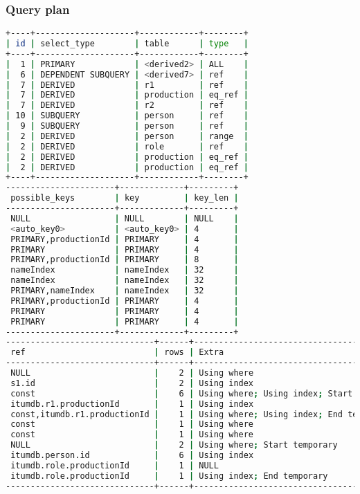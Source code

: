 \subsubsection{Query plan}
\begin{lstlisting}[language=bash]
+----+--------------------+------------+--------+
| id | select_type        | table      | type   |
+----+--------------------+------------+--------+
|  1 | PRIMARY            | <derived2> | ALL    |
|  6 | DEPENDENT SUBQUERY | <derived7> | ref    |
|  7 | DERIVED            | r1         | ref    |
|  7 | DERIVED            | production | eq_ref |
|  7 | DERIVED            | r2         | ref    |
| 10 | SUBQUERY           | person     | ref    |
|  9 | SUBQUERY           | person     | ref    |
|  2 | DERIVED            | person     | range  |
|  2 | DERIVED            | role       | ref    |
|  2 | DERIVED            | production | eq_ref |
|  2 | DERIVED            | production | eq_ref |
+----+--------------------+------------+--------+
----------------------+-------------+---------+
 possible_keys        | key         | key_len |
----------------------+-------------+---------+
 NULL                 | NULL        | NULL    |
 <auto_key0>          | <auto_key0> | 4       |
 PRIMARY,productionId | PRIMARY     | 4       |
 PRIMARY              | PRIMARY     | 4       |
 PRIMARY,productionId | PRIMARY     | 8       |
 nameIndex            | nameIndex   | 32      |
 nameIndex            | nameIndex   | 32      |
 PRIMARY,nameIndex    | nameIndex   | 32      |
 PRIMARY,productionId | PRIMARY     | 4       |
 PRIMARY              | PRIMARY     | 4       |
 PRIMARY              | PRIMARY     | 4       |
----------------------+-------------+---------+
------------------------------+------+-------------------------------------------+
 ref                          | rows | Extra                                     |
------------------------------+------+-------------------------------------------+
 NULL                         |    2 | Using where                               |
 s1.id                        |    2 | Using index                               |
 const                        |    6 | Using where; Using index; Start temporary |
 itumdb.r1.productionId       |    1 | Using index                               |
 const,itumdb.r1.productionId |    1 | Using where; Using index; End temporary   |
 const                        |    1 | Using where                               |
 const                        |    1 | Using where                               |
 NULL                         |    2 | Using where; Start temporary              |
 itumdb.person.id             |    6 | Using index                               |
 itumdb.role.productionId     |    1 | NULL                                      |
 itumdb.role.productionId     |    1 | Using index; End temporary                |
------------------------------+------+-------------------------------------------+

\end{lstlisting}


